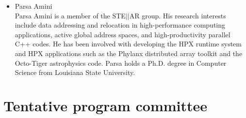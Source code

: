 \documentclass{article}
\begin{document}
\begin{itemize}
\item Parsa Amini \\
Parsa Amini is a member of the STE$\vert\vert$AR group. His research interests include data addressing and relocation in high-performance computing applications, active global address spaces, and high-productivity parallel C++ codes. He has been involved with developing the HPX runtime system and HPX applications such as the Phylanx distributed array toolkit and the Octo-Tiger astrophysics code. Parsa holds a Ph.D. degree in Computer Science from Louisiana State University.
\end{itemize}

\section*{Tentative program committee} 
\end{document}
